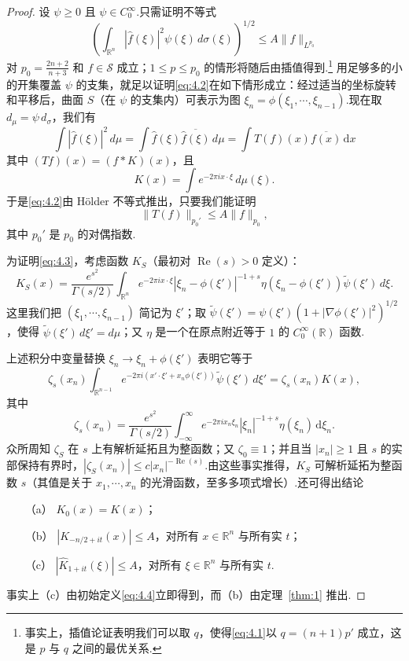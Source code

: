 \documentclass[
  BookTitleCN={傅里叶分析中的振动积分},
  BookTitleEN={Oscillatory Integrals in Fourier Analysis},
  OriginalAuthor={E.~M. Stein},
  OriginalEdition={Proc. Sympos. Pure Math. 35, Part~1},
  OriginalPublisher={American Mathematical Society},
  OriginalYear={1979},
  Translator={翻译及重排},
  ModelUsed={Codex CLI},
  Biblatex=false,
  TranslationDate={2026年8月27日}
]{mathtranslation}
\numberwithin{equation}{chapter}   %
\newcommand{\R}{\mathbb{R}}
\begin{document}
\begin{proof}
  设 $\psi\geq0$ 且 $\psi\in C_0^\infty$.只需证明不等式
  \begin{equation}
    \left(\int_{\R^{n}}|\hat{f}(\xi)|^{2}\psi(\xi)\,d\sigma(\xi)\right)^{1/2}\leq A\|f\|_{L^{p_{0}}} \label{eq:4.2}
  \end{equation}
  对 $p_{0}=\frac{2n+2}{n+3}$ 和 $f\in\mathcal{S}$ 成立；$1\leq p\leq p_{0}$ 的情形将随后由插值得到.\footnote{事实上，插值论证表明我们可以取 $q$，使得\eqref{eq:4.1}以 $q=(n+1)p'$ 成立，这是 $p$ 与 $q$ 之间的最优关系.} 用足够多的小的开集覆盖 $\psi$ 的支集，就足以证明\eqref{eq:4.2}在如下情形成立：经过适当的坐标旋转和平移后，曲面 $S$（在 $\psi$ 的支集内）可表示为图 $\xi_{n}=\phi(\xi_{1},\cdots,\xi_{n-1})$.现在取 $d_{\mu}=\psi\,d_{\sigma}$，我们有
  \[
    \int|\hat{f}(\xi)|^{2}\,d\mu = \int\hat{f}(\xi)\overline{\hat{f}(\xi)}\,d\mu = \int T(f)(x)\overline{f(x)}\,\mathrm{d}x
  \]
  其中 $(Tf)(x)=(f*K)(x)$，且
  \[
    K(x)=\int e^{-2\pi i x\cdot\xi}\,d\mu(\xi) .
  \]
  于是\eqref{eq:4.2}由 H\"older 不等式推出，只要我们能证明
  \begin{equation}
    \|T(f)\|_{p_{0}'}\leq A\|f\|_{p_{0}}, \label{eq:4.3}
  \end{equation}
  其中 $p_{0}'$ 是 $p_{0}$ 的对偶指数.

  为证明\eqref{eq:4.3}，考虑函数 $K_{S}$（最初对 $\operatorname{Re}(s)>0$ 定义）：
  \begin{equation}
    K_{S}(x) = \frac{e^{s^{2}}}{\Gamma(s/2)}\int_{\R^{n}}e^{-2\pi i x\cdot\xi}|\xi_{n}-\phi(\xi')|^{-1+s}\eta(\xi_{n}-\phi(\xi'))\tilde\psi(\xi')\,d\xi . \label{eq:4.4}
  \end{equation}
  这里我们把 $(\xi_{1},\cdots,\xi_{n-1})$ 简记为 $\xi'$；取 $\tilde\psi(\xi')=\psi(\xi')(1+|\nabla\phi(\xi')|^{2})^{1/2}$，使得 $\tilde\psi(\xi')\,d\xi'=d\mu$；又 $\eta$ 是一个在原点附近等于 $1$ 的 $C_{0}^{\infty}(\R)$ 函数.

  上述积分中变量替换 $\xi_{n}\to\xi_{n}+\phi(\xi')$ 表明它等于
  \[
    \zeta_{s}(x_{n})\int_{\R^{n-1}}e^{-2\pi i(x'\cdot\xi'+x_{n}\phi(\xi'))}\tilde\psi(\xi')\,d\xi' = \zeta_{s}(x_{n})K(x),
  \]
  其中
  \[
    \zeta_{s}(x_{n}) = \frac{e^{s^{2}}}{\Gamma(s/2)}\int_{-\infty}^{\infty}e^{-2\pi i x_{n}\xi_{n}}|\xi_{n}|^{-1+s}\eta(\xi_{n})\,\mathrm{d}\xi_{n} .
  \]
  众所周知 $\zeta_{S}$ 在 $s$ 上有解析延拓且为整函数；又 $\zeta_{0}\equiv1$；并且当 $|x_{n}|\geq1$ 且 $s$ 的实部保持有界时，$|\zeta_{S}(x_{n})|\leq c|x_{n}|^{-\operatorname{Re}(s)}$.由这些事实推得，$K_{S}$ 可解析延拓为整函数 $s$（其值是关于 $x_{1},\cdots,x_{n}$ 的光滑函数，至多多项式增长）.还可得出结论
  \begin{enumerate}
    \item[（a）] $K_{0}(x)=K(x)$；
    \item[（b）] $|K_{-n/2+it}(x)|\leq A$，对所有 $x\in\R^{n}$ 与所有实 $t$；
    \item[（c）] $|\hat{K}_{1+it}(\xi)|\leq A$，对所有 $\xi\in\R^{n}$ 与所有实 $t$.
  \end{enumerate}
  事实上（c）由初始定义\eqref{eq:4.4}立即得到，而（b）由定理~\ref{thm:1} 推出.


\end{proof}
\end{document}
